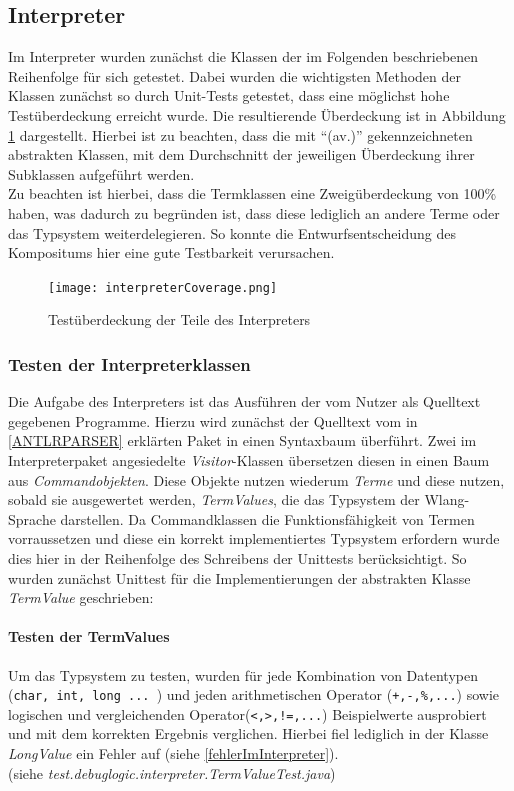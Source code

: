 \documentclass[parskip=full]{scrartcl}
\begin{document}
\subsection{Interpreter}
Im Interpreter wurden zunächst die Klassen der im Folgenden beschriebenen Reihenfolge für sich getestet. 
Dabei wurden die wichtigsten Methoden der Klassen zunächst so durch Unit-Tests getestet, dass eine möglichst hohe Testüberdeckung erreicht wurde. Die resultierende Überdeckung ist in Abbildung \ref{AbdeckungImInterpreter} dargestellt. Hierbei ist zu beachten, dass die mit \enquote{(av.)} gekennzeichneten abstrakten Klassen, mit dem Durchschnitt der jeweiligen Überdeckung ihrer Subklassen aufgeführt werden. \\ Zu beachten ist hierbei, dass die Termklassen eine Zweigüberdeckung von 100\% haben, was dadurch zu begründen ist, dass diese lediglich an andere Terme oder das Typsystem weiterdelegieren. So konnte die Entwurfsentscheidung des Kompositums hier eine gute Testbarkeit verursachen.
\begin{figure}[!h]
\centering
\texttt{[image: interpreterCoverage.png]}
\caption{Testüberdeckung der Teile des Interpreters}\label{AbdeckungImInterpreter}
\end{figure}


\subsubsection{Testen der Interpreterklassen}
Die Aufgabe des Interpreters ist das Ausführen der vom Nutzer als Quelltext gegebenen Programme. Hierzu wird zunächst der Quelltext vom in \ref{ANTLRPARSER} erklärten Paket in einen Syntaxbaum überführt.
Zwei im Interpreterpaket angesiedelte \textit{Visitor}-Klassen übersetzen diesen in einen Baum aus \textit{Commandobjekten}. Diese Objekte nutzen wiederum \textit{Terme} und diese nutzen, sobald sie ausgewertet werden, \textit{TermValues}, die das Typsystem der Wlang-Sprache darstellen. 
Da Commandklassen die Funktionsfähigkeit von Termen vorraussetzen und diese ein korrekt implementiertes Typsystem erfordern wurde dies hier in der Reihenfolge des Schreibens der Unittests berücksichtigt.
So wurden zunächst Unittest für die Implementierungen der abstrakten Klasse \textit{TermValue} geschrieben:
\paragraph{Testen der TermValues}
Um das Typsystem zu testen, wurden für jede Kombination von Datentypen (\texttt{char, int, long ... }) und jeden arithmetischen Operator (\texttt{+,-,\%,...}) sowie logischen und vergleichenden Operator(\texttt{<,>,!=,...}) Beispielwerte ausprobiert und mit dem korrekten Ergebnis verglichen. Hierbei fiel lediglich in der Klasse \textit{LongValue} ein Fehler auf (siehe \ref{fehlerImInterpreter}).\\
(siehe \textit{test.debuglogic.interpreter.TermValueTest.java})
\end{document}
